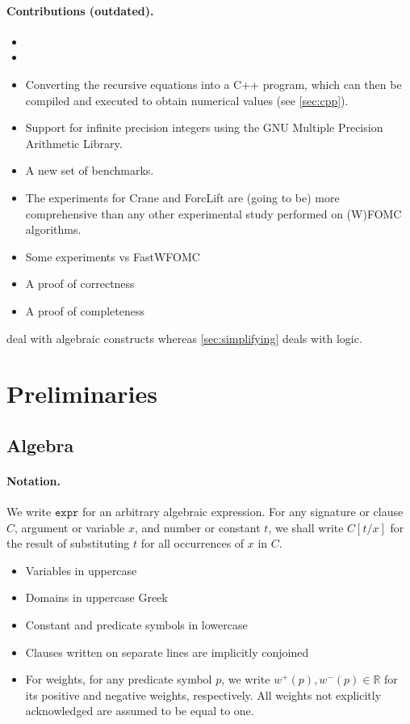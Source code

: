 \documentclass{article}
\newcommand{\expr}{\mathtt{expr}}
\begin{document}
\paragraph{Contributions (outdated).}
\begin{itemize}
  \item {}
  \item {}
  \item Converting the recursive equations into a C++ program, which can then be
        compiled and executed to obtain numerical values (see \cref{sec:cpp}).
  \item Support for infinite precision integers using the GNU Multiple Precision
        Arithmetic Library.
  \item A new set of benchmarks.
  \item The experiments for Crane and ForcLift are (going to be) more
        comprehensive than any other experimental study performed on (W)FOMC
        algorithms.
  \item Some experiments vs FastWFOMC
  \item A proof of correctness
  \item A proof of completeness
\end{itemize}


 deal with algebraic constructs whereas
\cref{sec:simplifying} deals with logic.

\section{Preliminaries}

\subsection{Algebra}

\paragraph{Notation.}
We write $\expr{}$ for an arbitrary algebraic expression. For any signature or
clause $C$, argument or variable $x$, and number or constant $t$, we shall write
$C[t / x]$ for the result of substituting $t$ for all occurrences of $x$ in $C$.

\begin{itemize}
  \item Variables in uppercase
  \item Domains in uppercase Greek
  \item Constant and predicate symbols in lowercase
  \item Clauses written on separate lines are implicitly conjoined
  \item For weights, for any predicate symbol $p$, we write
        $w^{+}(p), w^{-}(p) \in \mathbb{R}$ for its positive and negative
        weights, respectively. All weights not explicitly acknowledged are
        assumed to be equal to one.
\end{itemize}
\end{document}
